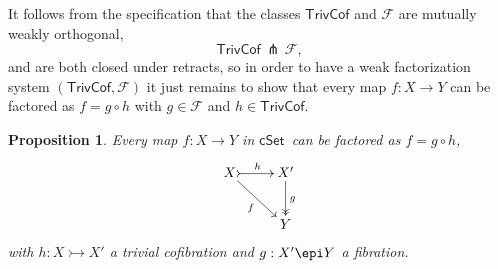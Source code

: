 \documentclass[11pt]{article}
\newcommand{\cSet}{\ensuremath{\mathsf{cSet}}}
\newcommand{\mono}{\ensuremath{\rightarrowtail}}
\newcommand{\ra}{\ensuremath{\rightarrow}}
\newtheorem{proposition}[theorem]{Proposition}
\theoremstyle{remark}
\theoremstyle{definition}
\begin{document}
It follows from the specification that the classes $\mathsf{TrivCof}$ and $\mathcal{F}$ are mutually weakly orthogonal,
\[
\mathsf{TrivCof}\, {\pitchfork}\, \mathcal{F},
\]
and are both closed under retracts, so in order to have a weak factorization system $(\mathsf{TrivCof}, \mathcal{F})$  it just remains to show that every map $f: X\ra Y$ can be factored as $f  = g\circ h$ with $g\in \mathcal{F}$ and $h\in \mathsf{TrivCof}$.

\begin{proposition}
Every map $f: X\to Y$ in \cSet\ can be factored as $f  = g\circ h$,
\begin{equation}%
\xymatrix{
X \ar[rd]_{f} \ar@{>->}[r]^h & X'\ar@{->>}[d]^g\\
& Y
}
\end{equation}
with $h: X\mono X'$ a trivial cofibration and $g: X'\epi Y$ a fibration.
\end{proposition}
\end{document}
